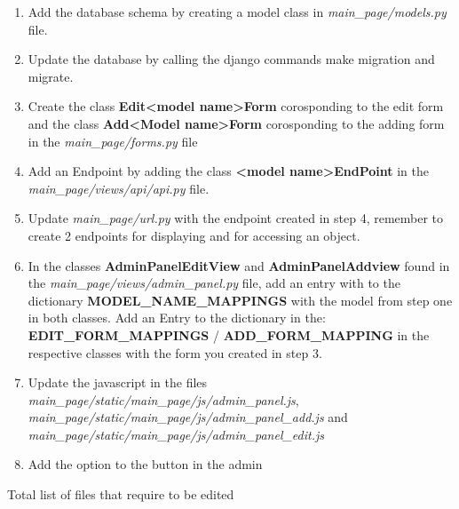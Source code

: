 \documentclass{article}
\begin{document}
\begin{enumerate}
	\item Add the database schema by creating a model class in \textit{main\_page/models.py} file.
	\item Update the database by calling the django commands make migration and migrate.
	\item Create the class \textbf{Edit<model name>Form} corosponding to the edit form and the class \textbf{Add<Model name>Form} corosponding to the adding form in the \textit{main\_page/forms.py} file
	\item Add an Endpoint by adding the class \textbf{<model name>EndPoint} in the \textit{main\_page/views/api/api.py} file.
	\item Update \textit{main\_page/url.py} with the endpoint created in step 4, remember to create 2 endpoints for displaying and for accessing an object. 
	\item In the classes \textbf{AdminPanelEditView} and \textbf{AdminPanelAddview} found in the \textit{main\_page/views/admin\_panel.py} file, add an entry with to the dictionary \textbf{MODEL\_NAME\_MAPPINGS} with the model from step one in both classes. Add an Entry to the dictionary in the:\\ \textbf{EDIT\_FORM\_MAPPINGS} / \textbf{ADD\_FORM\_MAPPING} in the respective classes with the form you created in step 3.
	\item Update the javascript in the files \textit{main\_page/static/main\_page/js/admin\_panel.js}, \textit{main\_page/static/main\_page/js/admin\_panel\_add.js} and\\ \textit{main\_page/static/main\_page/js/admin\_panel\_edit.js}
	\item Add the option to the button in the admin
\end{enumerate} 
Total list of files that require to be edited
\end{document}
